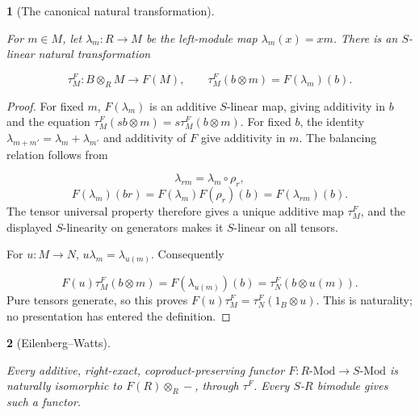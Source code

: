 \documentclass[11pt,a4paper]{article}
\newcommand{\mathheading}{}
\theoremstyle{plain}
\newtheorem*{plainstatement}{\mathheading}
\theoremstyle{definition}
\newenvironment{mathstatement}[3]{\renewcommand{\mathheading}{#1 #2}\begin{plainstatement}[#3]}{\end{plainstatement}}
\begin{document}
\begin{mathstatement}{Lemma}{9.3}{The canonical natural transformation}
\label{env-9-3}

For \(m\in M\), let \(\lambda_m:R\to M\) be the left-module map \(\lambda_m(x)=xm\). There is an \(S\)-linear natural transformation

 \[\tau^F_M:B\otimes_R M\longrightarrow F(M),\qquad \tau^F_M(b\otimes m)=F(\lambda_m)(b).\]
\par{}\par

\end{mathstatement}
 
\begin{proof}

For fixed \(m\), \(F(\lambda_m)\) is an additive \(S\)-linear map, giving additivity in \(b\) and the equation \(\tau^F_M(sb\otimes m)=s\tau^F_M(b\otimes m)\). For fixed \(b\), the identity \(\lambda_{m+m'}=\lambda_m+\lambda_{m'}\) and additivity of \(F\) give additivity in \(m\). The balancing relation follows from

 \[\lambda_{rm}=\lambda_m\circ\rho_r,\] \[F(\lambda_m)(br)=F(\lambda_m)F(\rho_r)(b)=F(\lambda_{rm})(b).\] 
The tensor universal property therefore gives a unique additive map \(\tau^F_M\), and the displayed \(S\)-linearity on generators makes it \(S\)-linear on all tensors.

 
For \(u:M\to N\), \(u\lambda_m=\lambda_{u(m)}\). Consequently

 \[F(u)\tau^F_M(b\otimes m)=F(\lambda_{u(m)})(b)=\tau^F_N(b\otimes u(m)).\] 
Pure tensors generate, so this proves \(F(u)\tau^F_M=\tau^F_N(1_B\otimes u)\). This is naturality; no presentation has entered the definition.


\end{proof}
 
\begin{mathstatement}{Theorem}{9.4}{Eilenberg--Watts}
\label{env-9-4}

Every additive, right-exact, coproduct-preserving functor \(F:R\text{-Mod}\to S\text{-Mod}\) is naturally isomorphic to \(F(R)\otimes_R-\), through \(\tau^F\). Every \(S\)-\(R\) bimodule gives such a functor.


\par{}\par

\end{mathstatement}
 
\end{document}
